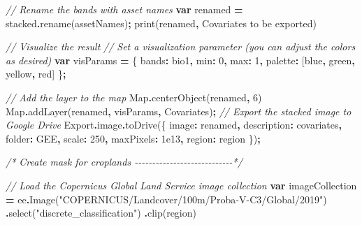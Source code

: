 \documentclass[
  10pt,
  b5paper,
  oneside]{book}
\newenvironment{Shaded}{\begin{snugshade}}{\end{snugshade}}
\newcommand{\AttributeTok}[1]{\textcolor[rgb]{0.77,0.63,0.00}{#1}}
\newcommand{\BuiltInTok}[1]{#1}
\newcommand{\CommentTok}[1]{\textcolor[rgb]{0.56,0.35,0.01}{\textit{#1}}}
\newcommand{\DataTypeTok}[1]{\textcolor[rgb]{0.13,0.29,0.53}{#1}}
\newcommand{\DecValTok}[1]{\textcolor[rgb]{0.00,0.00,0.81}{#1}}
\newcommand{\FloatTok}[1]{\textcolor[rgb]{0.00,0.00,0.81}{#1}}
\newcommand{\FunctionTok}[1]{\textcolor[rgb]{0.00,0.00,0.00}{#1}}
\newcommand{\KeywordTok}[1]{\textcolor[rgb]{0.13,0.29,0.53}{\textbf{#1}}}
\newcommand{\NormalTok}[1]{#1}
\newcommand{\OperatorTok}[1]{\textcolor[rgb]{0.81,0.36,0.00}{\textbf{#1}}}
\newcommand{\StringTok}[1]{\textcolor[rgb]{0.31,0.60,0.02}{#1}}
\begin{document}
\begin{Shaded}
\begin{Highlighting}[]
\CommentTok{// Rename the bands with asset names}
\KeywordTok{var}\NormalTok{ renamed }\OperatorTok{=}\NormalTok{ stacked}\OperatorTok{.}\FunctionTok{rename}\NormalTok{(assetNames)}\OperatorTok{;}
\FunctionTok{print}\NormalTok{(renamed}\OperatorTok{,} \StringTok{\textquotesingle{}Covariates to be exported\textquotesingle{}}\NormalTok{)}

\CommentTok{// Visualize the result}
\CommentTok{// Set a visualization parameter (you can adjust the colors as desired)}
\KeywordTok{var}\NormalTok{ visParams }\OperatorTok{=}\NormalTok{ \{}
  \DataTypeTok{bands}\OperatorTok{:} \StringTok{\textquotesingle{}bio1\textquotesingle{}}\OperatorTok{,}
  \DataTypeTok{min}\OperatorTok{:} \DecValTok{0}\OperatorTok{,}
  \DataTypeTok{max}\OperatorTok{:} \DecValTok{1}\OperatorTok{,}
  \DataTypeTok{palette}\OperatorTok{:}\NormalTok{ [}\StringTok{\textquotesingle{}blue\textquotesingle{}}\OperatorTok{,} \StringTok{\textquotesingle{}green\textquotesingle{}}\OperatorTok{,} \StringTok{\textquotesingle{}yellow\textquotesingle{}}\OperatorTok{,} \StringTok{\textquotesingle{}red\textquotesingle{}}\NormalTok{]}
\NormalTok{\}}\OperatorTok{;}

\CommentTok{// Add the layer to the map}
\BuiltInTok{Map}\OperatorTok{.}\FunctionTok{centerObject}\NormalTok{(renamed}\OperatorTok{,} \DecValTok{6}\NormalTok{)}
\BuiltInTok{Map}\OperatorTok{.}\FunctionTok{addLayer}\NormalTok{(renamed}\OperatorTok{,}\NormalTok{ visParams}\OperatorTok{,} \StringTok{\textquotesingle{}Covariates\textquotesingle{}}\NormalTok{)}\OperatorTok{;}
\CommentTok{// Export the stacked image to Google Drive}
\NormalTok{Export}\OperatorTok{.}\AttributeTok{image}\OperatorTok{.}\FunctionTok{toDrive}\NormalTok{(\{}
  \DataTypeTok{image}\OperatorTok{:}\NormalTok{ renamed}\OperatorTok{,}
  \DataTypeTok{description}\OperatorTok{:} \StringTok{\textquotesingle{}covariates\textquotesingle{}}\OperatorTok{,}
  \DataTypeTok{folder}\OperatorTok{:} \StringTok{\textquotesingle{}GEE\textquotesingle{}}\OperatorTok{,}
  \DataTypeTok{scale}\OperatorTok{:} \DecValTok{250}\OperatorTok{,}
  \DataTypeTok{maxPixels}\OperatorTok{:} \FloatTok{1e13}\OperatorTok{,}
  \DataTypeTok{region}\OperatorTok{:}\NormalTok{ region}
\NormalTok{\})}\OperatorTok{;}

\CommentTok{/* Create mask for croplands {-}{-}{-}{-}{-}{-}{-}{-}{-}{-}{-}{-}{-}{-}{-}{-}{-}{-}{-}{-}{-}{-}{-}{-}{-}{-}{-}{-}*/}

\CommentTok{// Load the Copernicus Global Land Service image collection}
\KeywordTok{var}\NormalTok{ imageCollection }\OperatorTok{=}\NormalTok{ ee}\OperatorTok{.}\FunctionTok{Image}\NormalTok{(}\StringTok{"COPERNICUS/Landcover/100m/Proba{-}V{-}C3/Global/2019"}\NormalTok{)}
  \OperatorTok{.}\FunctionTok{select}\NormalTok{(}\StringTok{"discrete\_classification"}\NormalTok{)}
  \OperatorTok{.}\FunctionTok{clip}\NormalTok{(region)}


\end{Highlighting}
\end{Shaded}
\end{document}
